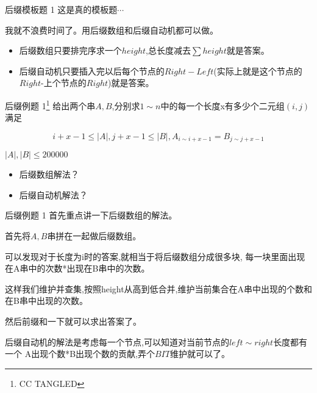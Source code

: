 \documentclass[10pt]{beamer}
\begin{document}
	\begin{frame}{后缀模板题 1}
		这是真的模板题$\cdots$

		\vspace{2ex}

		我就不浪费时间了。用后缀数组和后缀自动机都可以做。\pause

		\vspace{2ex}

		\begin{itemize}
			\item 后缀数组只要排完序求一个$height$,总长度减去$\sum height$就是答案。
			\item 后缀自动机只要插入完以后每个节点的$Right - Left$(实际上就是这个节点的$Right$-上个节点的$Right$)就是答案。
		\end{itemize}
	\end{frame}
	\begin{frame}{后缀例题 1\footnote{CC TANGLED}}
		给出两个串$A,B$,分别求$ 1 \sim n $中的每一个长度x有多少个二元组$(i,j)$满足

			$$i+x-1 \leq |A|,j+x-1 \leq |B|,A_{i \sim i+x-1}=B_{j \sim j+x-1}$$


		\vspace{2ex}

		$|A|,|B| \leq 200000$

		\vspace{2ex}

		\begin{itemize}
			\item 后缀数组解法？

			\vspace{2ex}

			\item 后缀自动机解法？
		\end{itemize}
	\end{frame}
	\begin{frame}{后缀例题 1}
		首先重点讲一下后缀数组的解法。

		首先将$A,B$串拼在一起做后缀数组。

		可以发现对于长度为i时的答案,就相当于将后缀数组分成很多块,
		每一块里面出现在A串中的次数*出现在B串中的次数。\pause

		这样我们维护并查集,按照height从高到低合并,维护当前集合在A串中出现的个数和在B串中出现的次数。

		然后前缀和一下就可以求出答案了。\pause
		
		\vspace{2ex}

		后缀自动机的解法是考虑每一个节点,可以知道对当前节点的$left\sim right$长度都有一个
		A出现个数*B出现个数的贡献,弄个$BIT$维护就可以了。

	\end{frame}
\end{document}
